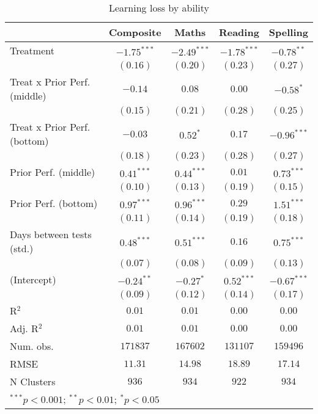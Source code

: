 
\begin{table}
\begin{center}
\begin{tabular}{l c c c c}
\hline
 & Composite & Maths & Reading & Spelling \\
\hline
Treatment                    & $-1.75^{***}$ & $-2.49^{***}$ & $-1.78^{***}$ & $-0.78^{**}$  \\
                             & $(0.16)$      & $(0.20)$      & $(0.23)$      & $(0.27)$      \\
Treat x Prior Perf. (middle) & $-0.14$       & $0.08$        & $0.00$        & $-0.58^{*}$   \\
                             & $(0.15)$      & $(0.21)$      & $(0.28)$      & $(0.25)$      \\
Treat x Prior Perf. (bottom) & $-0.03$       & $0.52^{*}$    & $0.17$        & $-0.96^{***}$ \\
                             & $(0.18)$      & $(0.23)$      & $(0.28)$      & $(0.27)$      \\
Prior Perf. (middle)         & $0.41^{***}$  & $0.44^{***}$  & $0.01$        & $0.73^{***}$  \\
                             & $(0.10)$      & $(0.13)$      & $(0.19)$      & $(0.15)$      \\
Prior Perf. (bottom)         & $0.97^{***}$  & $0.96^{***}$  & $0.29$        & $1.51^{***}$  \\
                             & $(0.11)$      & $(0.14)$      & $(0.19)$      & $(0.18)$      \\
Days between tests (std.)    & $0.48^{***}$  & $0.51^{***}$  & $0.16$        & $0.75^{***}$  \\
                             & $(0.07)$      & $(0.08)$      & $(0.09)$      & $(0.13)$      \\
(Intercept)                  & $-0.24^{**}$  & $-0.27^{*}$   & $0.52^{***}$  & $-0.67^{***}$ \\
                             & $(0.09)$      & $(0.12)$      & $(0.14)$      & $(0.17)$      \\
\hline
R$^2$                        & $0.01$        & $0.01$        & $0.00$        & $0.00$        \\
Adj. R$^2$                   & $0.01$        & $0.01$        & $0.00$        & $0.00$        \\
Num. obs.                    & $171837$      & $167602$      & $131107$      & $159496$      \\
RMSE                         & $11.31$       & $14.98$       & $18.89$       & $17.14$       \\
N Clusters                   & $936$         & $934$         & $922$         & $934$         \\
\hline
\multicolumn{5}{l}{\scriptsize{$^{***}p<0.001$; $^{**}p<0.01$; $^{*}p<0.05$}}
\end{tabular}
\caption{Learning loss by ability}
\label{tableability}
\end{center}
\end{table}
